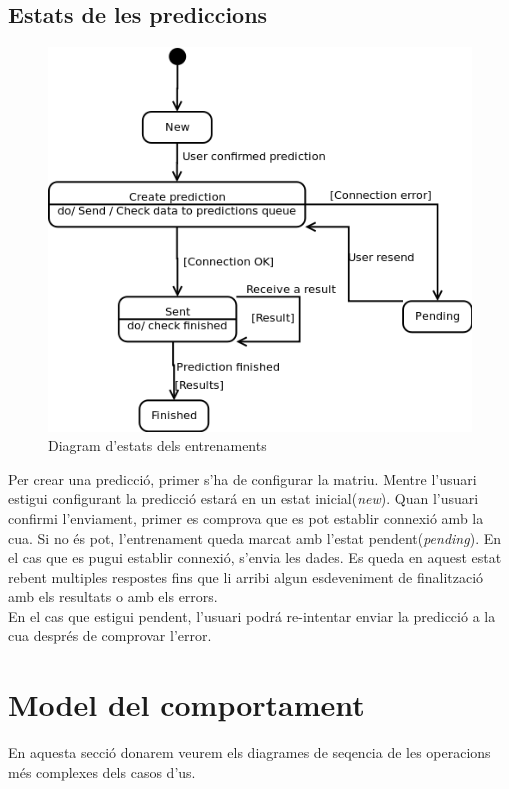 \subsection{Estats de les prediccions}
\begin{figure}[H]
  \centering
  \includegraphics[scale=0.4]{img/specification/StatesPrediction.png}
  \caption{Diagram d'estats dels entrenaments}
  \label{fig:statestraining}
\end{figure}
Per crear una predicci\'{o}, primer s'ha de configurar la matriu. Mentre l'usuari estigui configurant la predicci\'{o} estar\'{a} en un estat inicial(\textit{new}). Quan l'usuari confirmi l'enviament, primer es comprova que es pot establir connexi\'{o} amb la cua. Si no \'{e}s pot, l'entrenament queda marcat amb l'estat pendent(\textit{pending}). En el cas que es pugui establir connexi\'{o}, s'envia les dades. Es queda en aquest estat rebent multiples respostes fins que li arribi algun esdeveniment de finalitzaci\'{o} amb els resultats o amb els errors.\\
En el cas que estigui pendent, l'usuari podr\'{a} re-intentar enviar la predicci\'{o} a la cua despr\'{e}s de comprovar l'error.

\section{Model del comportament}
En aquesta secci\'{o} donarem veurem els diagrames de seqencia de les operacions m\'{e}s complexes dels casos d'us.
